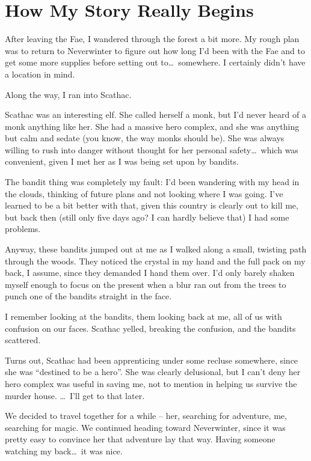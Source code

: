 \section*{How My Story Really Begins}
After leaving the Fae, I wandered through the forest a bit more. My rough plan was to return to Neverwinter to figure out how long I'd been with the Fae and to get some more supplies before setting out to\dots\ somewhere. I certainly didn't have a location in mind.

Along the way, I ran into Scathac.

Scathac was an interesting elf. She called herself a monk, but I'd never heard of a monk anything like her. She had a massive hero complex, and she was anything but calm and sedate (you know, the way monks should be). She was always willing to rush into danger without thought for her personal safety\dots\ which was convenient, given I met her as I was being set upon by bandits.

The bandit thing was completely my fault: I'd been wandering with my head in the clouds, thinking of future plans and not looking where I was going. I've learned to be a bit better with that, given this country is clearly out to kill me, but back then (still only five days ago? I can hardly believe that) I had some problems.

Anyway, these bandits jumped out at me as I walked along a small, twisting path through the woods. They noticed the crystal in my hand and the full pack on my back, I assume, since they demanded I hand them over. I'd only barely shaken myself enough to focus on the present when a blur ran out from the trees to punch one of the bandits straight in the face.

I remember looking at the bandits, them looking back at me, all of us with confusion on our faces. Scathac yelled, breaking the confusion, and the bandits scattered.

Turns out, Scathac had been apprenticing under some recluse somewhere, since she was ``destined to be a hero''. She was clearly delusional, but I can't deny her hero complex was useful in saving me, not to mention in helping us survive the murder house. \dots\ I'll get to that later.

We decided to travel together for a while -- her, searching for adventure, me, searching for magic. We continued heading toward Neverwinter, since it was pretty easy to convince her that adventure lay that way. Having someone watching my back\dots\ it was nice.

